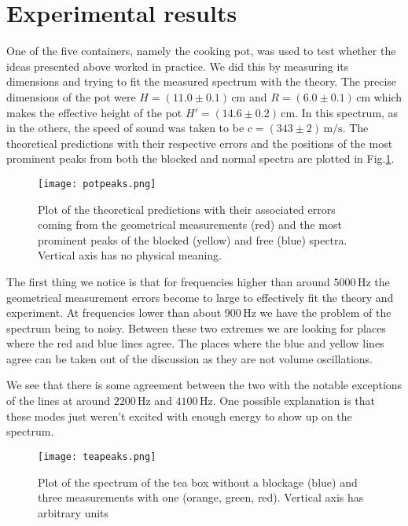 \documentclass[10pt,a4paper,twocolumn]{article}
\begin{document}
\section{Experimental results}

One of the five containers, namely the cooking pot, was used to test whether the ideas presented above worked in practice. We did this by measuring its dimensions and trying to fit the measured spectrum with the theory. The precise dimensions of the pot were $H = (11.0 \pm 0.1) \, \mathrm{cm}$ and $R = (6.0 \pm 0.1) \, \mathrm{cm}$ which makes the effective height of the pot $H' = (14.6 \pm 0.2) \, \mathrm{cm}$. In this spectrum, as in the others, the speed of sound was taken to be $c = (343 \pm 2) \, \mathrm{m/s}$. The theoretical predictions with their respective errors and the positions of the most prominent peaks from both the blocked and normal spectra are plotted in Fig.\ref{potpeaks}.

\begin{figure}[H]
\centering
\texttt{[image: potpeaks.png]}
\caption{Plot of the theoretical predictions with their associated errors coming from the geometrical measurements (red) and the most prominent peaks of the blocked (yellow) and free (blue) spectra. Vertical axis has no physical meaning.}
\label{potpeaks}
\end{figure}

The first thing we notice is that for frequencies higher than around $5000 \, \mathrm{Hz}$ the geometrical measurement errors become to large to effectively fit the theory and experiment. At frequencies lower than about $900 \, \mathrm{Hz}$ we have the problem of the spectrum being to noisy. Between these two extremes we are looking for places where the red and blue lines agree. The places where the blue and yellow lines agree can be taken out of the discussion as they are not volume oscillations.

We see that there is some agreement between the two with the notable exceptions of the lines at around $2200 \, \mathrm{Hz}$ and $4100 \, \mathrm{Hz}$. One possible explanation is that these modes just weren't excited with enough energy to show up on the spectrum.  

\begin{figure}
\centering
\texttt{[image: teapeaks.png]}
\caption{Plot of the spectrum of the tea box without a blockage (blue) and three measurements with one (orange, green, red). Vertical axis has arbitrary units}
\label{teapeaks}
\end{figure}
\end{document}
